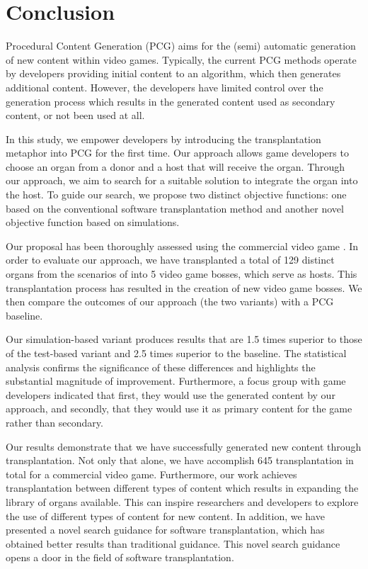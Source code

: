 \section{Conclusion}
\label{sec:Conclusion}

Procedural Content Generation (PCG) aims for the (semi) automatic generation of new content within video games.  Typically, the current PCG methods operate by developers providing initial content to an algorithm, which then generates additional content. However, the developers have limited control over the generation process which results in the generated content used as secondary content, or not been used at all.

In this study, we empower developers by introducing the transplantation metaphor into PCG for the first time. Our approach allows game developers to choose an organ from a donor and a host that will receive the organ. Through our approach, we aim to search for a suitable solution to integrate the organ into the host. To guide our search, we propose two distinct objective functions: one based on the conventional software transplantation method and another novel objective function based on simulations.

Our proposal has been thoroughly assessed using the commercial video game \CaseStudy{}. In order to evaluate our approach, we have transplanted a total of 129 distinct organs from the scenarios of \CaseStudy{} into 5 video game bosses, which serve as hosts. This transplantation process has resulted in the creation of new video game bosses. We then compare the outcomes of our approach (the two variants) with a PCG baseline.

Our simulation-based variant produces results that are 1.5 times superior to those of the test-based variant and 2.5 times superior to the baseline. The statistical analysis confirms the significance of these differences and highlights the substantial magnitude of improvement.
Furthermore, a focus group with game developers indicated that first, they would use the generated content by our approach, and secondly, that they would use it as primary content for the game rather than secondary.

Our results demonstrate that we have successfully generated new content through transplantation. Not only that alone, we have accomplish 645 transplantation in total for a commercial video game. Furthermore, our work achieves transplantation between different types of content which results in expanding the library of organs available. This can inspire researchers and developers to explore the use of different types of content for new content. 
In addition, we have presented a novel search guidance for software transplantation, which has obtained better results than traditional guidance. This novel search guidance opens a door in the field of software transplantation.

